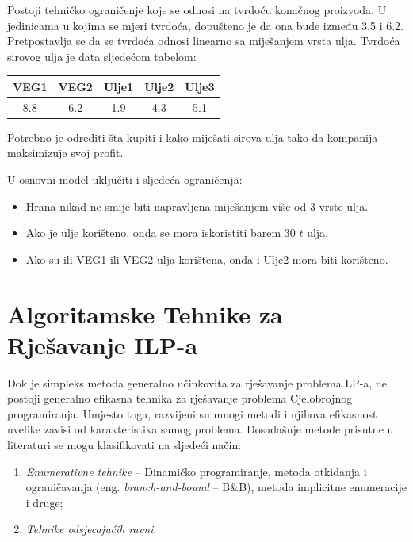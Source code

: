 \documentclass[a4paper, utf8, 11pt, colorlinks]{book}
\begin{document}
\begin{enumerate}
Postoji tehničko ograničenje koje se odnosi na tvrdoću konačnog proizvoda. U jedinicama u kojima se mjeri tvrdoća, dopušteno je da ona bude između 3.5 i 6.2. Pretpostavlja se da se tvrdoća odnosi linearno sa miješanjem vrsta ulja. Tvrdoća sirovog ulja je data sljedećom tabelom: 
\begin{table}[H]
	\centering
	\begin{tabular}{ccccc}
		    VEG1 & VEG2 & Ulje1 & Ulje2 & Ulje3 \\ \hline
		    8.8  & 6.2  & 1.9   & 4.3   & 5.1   \\
    \end{tabular} 
\end{table}

Potrebno je odrediti šta kupiti i kako miješati sirova ulja tako da kompanija maksimizuje svoj profit. 

U osnovni model uključiti i sljedeća ograničenja:
\begin{itemize}
	\item Hrana nikad ne smije biti napravljena miješanjem više od 3 vrste ulja. 
	\item Ako je ulje korišteno, onda se mora iskoristiti barem 30 $t$ ulja.
	\item Ako su ili VEG1 ili VEG2 ulja korištena, onda i Ulje2 mora biti korišteno.  
\end{itemize}

\end{enumerate}                                                       


 \chapter{Algoritamske Tehnike za Rješavanje ILP-a}
 
 Dok je simpleks metoda generalno učinkovita za rješavanje  problema LP-a, ne postoji generalno efikasna tehnika  za rješavanje problema Cjelobrojnog programiranja. Umjesto toga, razvijeni su mnogi metodi i njihova efikasnost
 uvelike zavisi od karakteristika samog problema. Dosadašnje metode prisutne u literaturi se mogu klasifikovati na sljedeći način:
 \begin{enumerate}
     \item \emph{Enumerativne tehnike} -- Dinamičko programiranje, metoda otkidanja i ograničavanja (eng. \emph{branch-and-bound} -- B\&B), metoda implicitne enumeracije i druge;
     \item \emph{Tehnike odsjecajućih ravni}.
 \end{enumerate}
\end{document}
